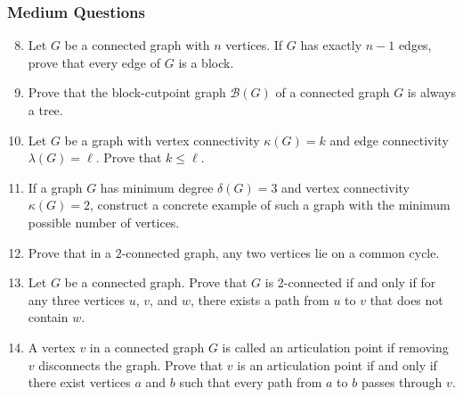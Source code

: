 \documentclass{article}
\theoremstyle{definition}
\begin{document}
\subsubsection{Medium Questions}
\begin{enumerate}\setcounter{enumi}{7}
\item Let $G$ be a connected graph with $n$ vertices. If $G$ has exactly $n-1$ edges, prove that every edge of $G$ is a block.

\item Prove that the block-cutpoint graph $\mathcal{B}(G)$ of a connected graph $G$ is always a tree.

\item Let $G$ be a graph with vertex connectivity $\kappa(G) = k$ and edge connectivity $\lambda(G) = \ell$. Prove that $k \leq \ell$.

\item If a graph $G$ has minimum degree $\delta(G) = 3$ and vertex connectivity $\kappa(G) = 2$, construct a concrete example of such a graph with the minimum possible number of vertices.

\item Prove that in a $2$-connected graph, any two vertices lie on a common cycle.

\item Let $G$ be a connected graph. Prove that $G$ is 2-connected if and only if for any three vertices $u$, $v$, and $w$, there exists a path from $u$ to $v$ that does not contain $w$.

\item A vertex $v$ in a connected graph $G$ is called an articulation point if removing $v$ disconnects the graph. Prove that $v$ is an articulation point if and only if there exist vertices $a$ and $b$ such that every path from $a$ to $b$ passes through $v$.
\end{enumerate}
\end{document}
